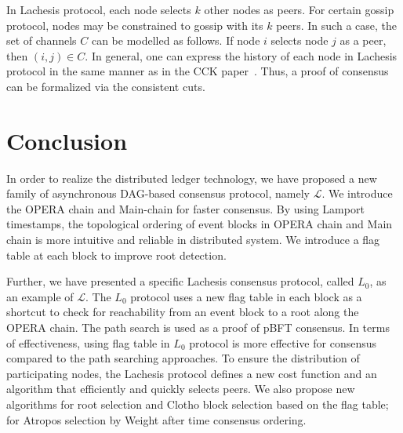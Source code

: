 \documentclass[preprint,12pt]{elsarticle}
\begin{document}
In Lachesis protocol, each node selects $k$ other nodes as peers. 
For certain gossip protocol, nodes may be constrained to gossip with its $k$ peers. In such a case, the set of channels $C$ can be modelled as follows.
If node $i$ selects node $j$ as a peer, then $(i,j) \in C$. In general, one can express the history of each node in Lachesis protocol in the same manner as in the CCK paper~\cite{cck92}.
Thus, a proof of consensus can be formalized via the consistent cuts.

%
%
%
%



\section{Conclusion}\label{se:con}
In order to realize the distributed ledger technology, we have proposed a new family of asynchronous DAG-based consensus protocol, namely $\mathcal{L}$. 
 We introduce the OPERA chain and Main-chain for faster consensus. By using Lamport timestamps, the topological ordering of event blocks in OPERA chain and Main chain is more intuitive and reliable in distributed system. We introduce a flag table at each block to improve root detection. 
 
 
Further, we have presented a specific Lachesis consensus protocol, called $L_0$, as an example of $\mathcal{L}$. The $L_0$ protocol uses a new flag table in each block as a shortcut to check for reachability from an event block to a root along the OPERA chain. The path search is used as a proof of pBFT consensus. In terms of effectiveness, using flag table in $L_0$ protocol is more effective for consensus compared to the path searching approaches. To ensure the distribution of participating nodes, the Lachesis protocol defines a new cost function and an algorithm that efficiently and quickly selects peers. We also propose new algorithms for root selection and Clotho block selection based on the flag table; for Atropos selection by Weight after time consensus ordering.  
\end{document}
